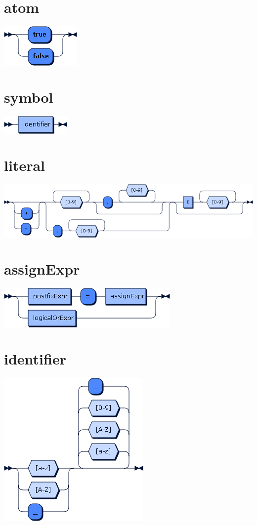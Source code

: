\begin{appendices}
\section*{atom}\includegraphics[scale=0.7]{img/ebnf_grammar/atom}
\section*{symbol}\includegraphics[scale=0.7]{img/ebnf_grammar/symbol}
\section*{literal}\includegraphics[scale=0.7]{img/ebnf_grammar/literal}
\section*{assignExpr}\includegraphics[scale=0.7]{img/ebnf_grammar/assignExpr}
\section*{identifier}\includegraphics[scale=0.7]{img/ebnf_grammar/identifier}


\end{appendices}
